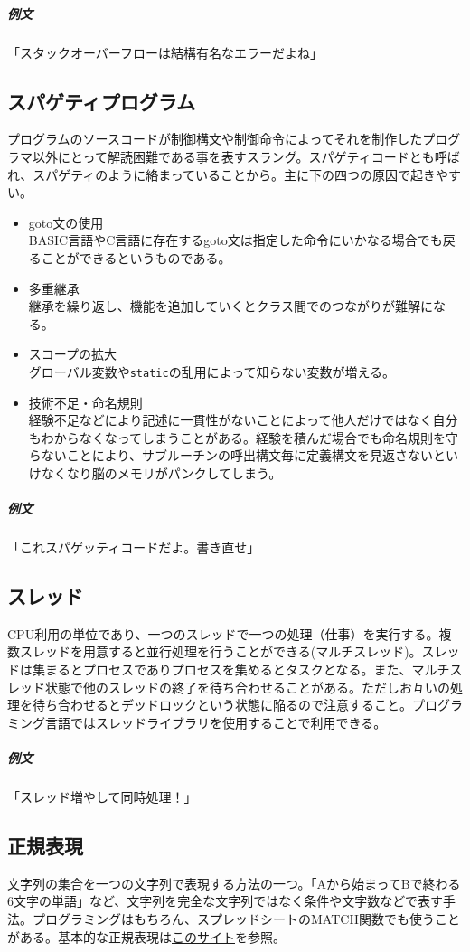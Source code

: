 \documentclass[dvipdfmx,jb5]{jreport}
\newcommand{\link}[2]{\href{#2}{#1}}
\newcommand{\terlogy}[2][|]{\colorbox{terlogy}{\texttt{\lstinline#1#2#1}}}
\begin{document}
\subparagraph{例文}「スタックオーバーフローは結構有名なエラーだよね」

\subsection{スパゲティプログラム}
プログラムのソースコードが制御構文や制御命令によってそれを制作したプログラマ以外にとって解読困難である事を表すスラング。スパゲティコードとも呼ばれ、スパゲティのように絡まっていることから。主に下の四つの原因で起きやすい。
\begin{itemize}
      \item goto文の使用\\
            BASIC言語やC言語に存在するgoto文は指定した命令にいかなる場合でも戻ることができるというものである。
      \item 多重継承\\
            継承を繰り返し、機能を追加していくとクラス間でのつながりが難解になる。
      \item スコープの拡大\\
            グローバル変数や\terlogy{static}の乱用によって知らない変数が増える。
      \item 技術不足・命名規則\\
            経験不足などにより記述に一貫性がないことによって他人だけではなく自分もわからなくなってしまうことがある。経験を積んだ場合でも命名規則を守らないことにより、サブルーチンの呼出構文毎に定義構文を見返さないといけなくなり脳のメモリがパンクしてしまう。
\end{itemize}

\subparagraph{例文}「これスパゲッティコードだよ。書き直せ」

\subsection{スレッド}
CPU利用の単位であり、一つのスレッドで一つの処理（仕事）を実行する。複数スレッドを用意すると並行処理を行うことができる(マルチスレッド)。スレッドは集まるとプロセスでありプロセスを集めるとタスクとなる。また、マルチスレッド状態で他のスレッドの終了を待ち合わせることがある。ただしお互いの処理を待ち合わせるとデッドロックという状態に陥るので注意すること。プログラミング言語ではスレッドライブラリを使用することで利用できる。

\subparagraph{例文}「スレッド増やして同時処理！」

\subsection{正規表現}
文字列の集合を一つの文字列で表現する方法の一つ。「Aから始まってBで終わる6文字の単語」など、文字列を完全な文字列ではなく条件や文字数などで表す手法。プログラミングはもちろん、スプレッドシートのMATCH関数でも使うことがある。基本的な正規表現は\link{このサイト}{https://murashun.jp/article/programming/regular-expression.html}を参照。
\end{document}
